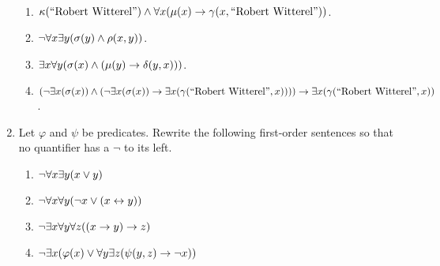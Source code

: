 \begin{enumerate}
\begin{minipage}{.5\linewidth}
\begin{align*}
            \end{align*}
        \end{minipage}
        \begin{enumerate}
            \item
                \(
                    \kappa(\text{``Robert Witterel''}) \meet
                    \forall x \pn*{\mu(x) \rightarrow \gamma(x, \text{``Robert Witterel''})}
                \).
            \item
                \(\neg \forall x \exists y \pn*{\sigma(y) \meet \rho(x, y)}\).
            \item
                \(\exists x \forall y \pn*{\sigma(x) \meet (\mu(y) \rightarrow \delta(y, x))}\).
            \item
                \(
                    \pn*{\neg \exists x \pn*{\sigma(x)}
                          \meet \pn*{\neg \exists x \pn*{\sigma(x)}
                          \rightarrow \exists x \pn*{\gamma(\text{``Robert Witterel''}, x)}}}
                    \rightarrow \exists x \pn*{\gamma(\text{``Robert Witterel''}, x)}
                \).
        \end{enumerate}
    \item
        Let \(\varphi\) and \(\psi\) be predicates.
        Rewrite the following first-order sentences so that no quantifier has a \(\neg\) to its left.
        \begin{enumerate}
            \item
                \(\neg \forall x \exists y (x \vee y)\)
            \item
                \(\neg \forall x \forall y (\neg x \vee (x \leftrightarrow y))\)
            \item
                \(\neg \exists x \forall y \forall z \pn*{\pn*{x \rightarrow y} \rightarrow z}\)
            \item
                \(\neg \exists x \pn*{\varphi(x) \join \forall y \exists z \pn*{\psi(y, z) \rightarrow \neg x}}\)
        \end{enumerate}
\end{enumerate}

